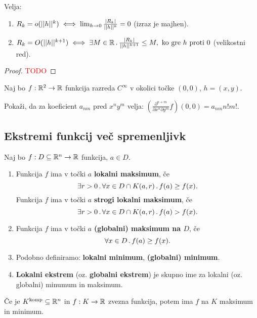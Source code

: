 \begin{opomba}
    Velja:
    \begin{enumerate}
        \item $R_k = o(||h||^k) \iff \lim_{h \to 0} \frac{|R_k|}{||h||^k} = 0$ (izraz je majhen).
        \item $R_k = O(||h||^{k+1}) \iff \exists M \in \mathbb{R} \,.\, \frac{|R_k|}{||h||^{k+1}} \leq M, \text{ ko gre } h \text{ proti } 0$ (velikostni red).
    \end{enumerate}
\end{opomba}

\begin{proof}
    \textcolor{red}{TODO}
\end{proof}

\begin{opomba}
    Naj bo $f: \mathbb{R}^2 \to \mathbb{R}$ funkcija razreda $C^\infty$ v okolici točke $(0,0)$, $h = (x, y)$. 
    
    Pokaži, da za koeficient $a_{nm}$ pred $x^ny^m$ velja: $(\frac{\partial^{n+m}}{\partial x^n \partial y^m} f)(0,0) = a_{nm} n!m!$. 
\end{opomba}

\newpage
\subsection{Ekstremi funkcij več spremenljivk}
\begin{definicija}
    Naj bo $f: D \subseteq \mathbb{R}^n \to \mathbb{R}$ funkcija, $a \in D$.
    \begin{enumerate}
        \item Funkcija $f$ ima v točki $a$ \textbf{lokalni maksimum}, če 
        $$\exists r>0 \,.\, \forall x \in D \cap K(a,r) \,.\, f(a) \geq f(x).$$ 
        Funkcija $f$ ima v točki $a$ \textbf{strogi lokalni maksimum}, če
        $$\exists r>0 \,.\, \forall x \in D \cap K(a,r) \,.\, f(a) > f(x).$$ 
        \item Funkcija $f$ ima v točki $a$ \textbf{(globalni) maksimum na $D$}, če 
        $$\forall x \in D \,.\, f(a) \geq f(x).$$
        \item Podobno definiramo: \textbf{lokalni minimum}, \textbf{(globalni) minimum}.
        \item \textbf{Lokalni ekstrem} (oz. \textbf{globalni ekstrem}) je skupno ime za lokalni (oz. globalni) minumum in maksimum.
    \end{enumerate}
\end{definicija}

\begin{opomba}
    Če je $K^\text{komp} \subseteq \mathbb{R}^n$ in $f: K \to \mathbb{R}$ zvezna funkcija, potem ima $f$ na $K$ maksimum in minimum.
\end{opomba}

